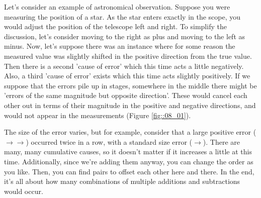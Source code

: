 \documentclass{ltjbook}
\begin{document}
Let's consider an example of astronomical observation. Suppose you were measuring the position of a star. As the star enters exactly in the scope, you would adjust the position of the telescope left and right. To simplify the discussion, let's consider moving to the right as plus and moving to the left as minus.
Now, let's suppose there was an instance where for some reason the measured value was slightly shifted in the positive direction from the true value. Then there is a second 'cause of error' which this time acts a little negatively. Also, a third 'cause of error' exists which this time acts slightly positively. If we suppose that the errors pile up in stages, somewhere in the middle there might be 'errors of the same magnitude but opposite direction'. These would cancel each other out in terms of their magnitude in the positive and negative directions, and would not appear in the measurements (Figure \ref{fig::08_01}).



The size of the error varies, but for example, consider that a large positive error ($\to \to$) occurred twice in a row, with a standard size error ($\to$). There are many, many cumulative causes, so it doesn't matter if it increases a little at this time.
Additionally, since we're adding them anyway, you can change the order as you like. Then, you can find pairs to offset each other here and there. In the end, it's all about how many combinations of multiple additions and subtractions would occur.
\end{document}
